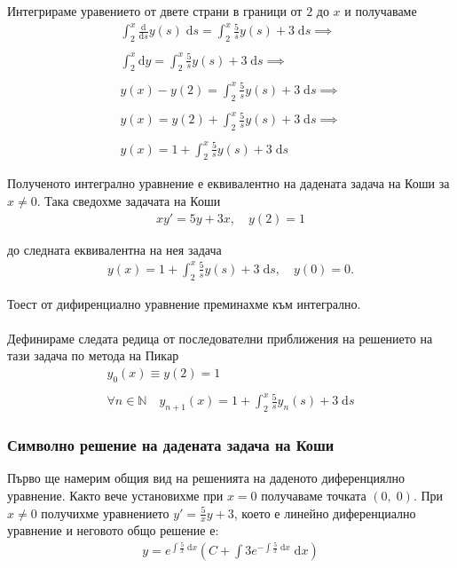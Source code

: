 \documentclass[a4paper, 12pt]{article}
\begin{document}
Интегрираме уравението от двете страни в граници от $2$ до $x$ и получаваме
\begin{align*}
    \displaystyle\int_2^x \frac{\mathrm d}{\mathrm d s}y(s) \; \mathrm d s = \displaystyle\int_2^x  \frac{5}{s}y(s) + 3 \; \mathrm d s \implies \\\\
    \displaystyle\int_2^x {\mathrm d y} = \displaystyle\int_2^x  \frac{5}{s}y(s) + 3 \; \mathrm d s \implies \\\\
    y(x) - y(2) = \displaystyle\int_2^x  \frac{5}{s}y(s) + 3 \; \mathrm d s \implies \\\\
    y(x) = y(2) + \displaystyle\int_2^x  \frac{5}{s}y(s) + 3 \; \mathrm d s \implies \\\\
    y(x) = 1 + \displaystyle\int_2^x  \frac{5}{s}y(s) + 3 \; \mathrm d s
\end{align*}

Полученото интегрално уравнение е еквивалентно
на дадената задача на Коши за $x \neq 0$. Така сведохме задачата на Коши
\begin{align*} 
    xy' = 5y + 3x, \quad y(2) = 1
\end{align*}

до следната еквивалентна на нея задача
\begin{align*} 
    y(x) = 1 + \displaystyle\int_2^x  \frac{5}{s}y(s) + 3 \; \mathrm d s, \quad y(0) = 0.
\end{align*}

Тоест от дифиренциално уравнение преминахме към интегрално. \\\\

Дефинираме следата редица от последователни приближения
на решението на тази задача по метода на Пикар
\begin{align*}
    y_0(x) \equiv y(2) = 1 \\\\
    \forall n \in \mathbb{N} \quad y_{n + 1}(x) = 1 + \displaystyle\int_2^x  \frac{5}{s}y_n(s) + 3 \; \mathrm d s
\end{align*}

\subsubsection{Символно решение на дадената задача на Коши}

Първо ще намерим общия вид на решенията на даденото
диференциялно уравнение. Както вече установихме при
$x = 0$ получаваме точката $(0, \; 0)$. При $x \neq 0$
получихме уравнението $y' = \frac{5}{x}y + 3$, което е
линейно диференциално уравнение и неговото общо решение е:
\begin{align*}
    y = e^{\int \frac{5}{x} \; {\mathrm d x}}\left(C + \int 3 e^{-\int \frac{5}{x} \; {\mathrm d x}} \; {\mathrm d x}\right)
\end{align*}
\end{document}
